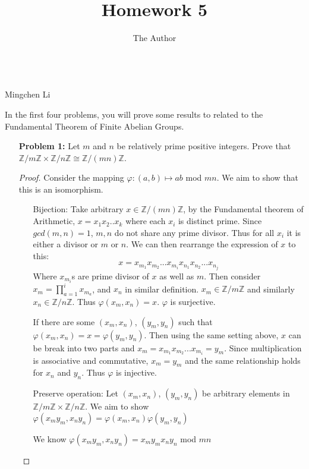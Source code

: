 \documentclass[11pt, oneside]{article}
\title{Homework 5}
\author{The Author}
\newcommand{\Z}{\mathbb Z}
\begin{document}
\begin{center}\\Mingchen Li\\ \end{center}
\thispagestyle{empty}



\hrulefill %

In the first four problems, you will prove some results to related to the Fundamental Theorem of Finite Abelian Groups.



\begin{enumerate}



\item[{\bf Problem 1:}] Let $m$ and $n$ be relatively prime positive integers. Prove that $\Z/m\Z\times \Z/n\Z\cong \Z/(mn)\Z$.
\begin{proof}
Consider the mapping $\varphi:(a,b)\mapsto ab$ mod $mn$. We aim to show that this is an isomorphism. 
\begin{enumerate}
    \item[Bijection: ] Take arbitrary $x\in \Z/(mn)\Z$, by the Fundamental theorem of Arithmetic, $x= x_1x_2..x_k$ where each $x_i$ is distinct prime. Since $gcd(m,n)=1$, $m, n$ do not share any prime divisor. Thus for all $x_i$ it is either a divisor or $m$ or $n$. We can then rearrange the expression of $x$ to this:
    \[x=x_m_1x_m_2...x_m_ix_n_1x_n_2...x_n_j\]
    Where $x_m_i$s are prime divisor of $x$ as well as $m$. Then consider $x_m=\prod_{a=1}^{i}x_m_a$, and $x_n$ in similar definition. $x_m\in \Z/m\Z$ and similarly $x_n\in \Z/n\Z$. Thus $\varphi(x_m, x_n)= x$. $\varphi$ is surjective.
    
    If there are some $(x_m, x_n)$, $(y_m, y_n)$ such that $\varphi(x_m, x_n)= x =\varphi(y_m, y_n)$. Then using the same setting above, $x$ can be break into two parts and $x_m=x_m_1x_m_2...x_m_i=y_m$. Since multiplication is associative and commutative, $x_m =y_m$ and the same relationship holds for $x_n$ and $y_n$. Thus $\varphi$ is injective.
    
    \item[Preserve operation: ] Let $(x_m, x_n)$, $(y_m, y_n)$ be arbitrary elements in $\Z/m\Z\times \Z/n\Z$. We aim to show $\varphi(x_my_m, x_ny_n)=\varphi(x_m, x_n)\varphi(y_m, y_n)$
    
    We know $\varphi(x_my_m, x_ny_n)=x_my_mx_ny_n$ mod $mn$ 
    

\end{enumerate}
\end{proof}
\end{enumerate}
\end{document}
